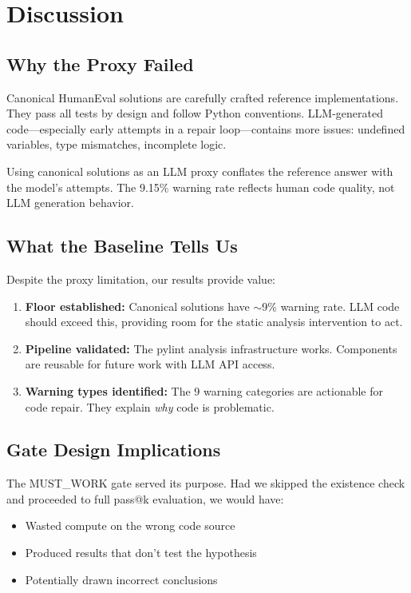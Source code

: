 \section{Discussion}

\subsection{Why the Proxy Failed}

Canonical HumanEval solutions are carefully crafted reference implementations. They pass all tests by design and follow Python conventions. LLM-generated code---especially early attempts in a repair loop---contains more issues: undefined variables, type mismatches, incomplete logic.

Using canonical solutions as an LLM proxy conflates the reference answer with the model's attempts. The 9.15\% warning rate reflects human code quality, not LLM generation behavior.

\subsection{What the Baseline Tells Us}

Despite the proxy limitation, our results provide value:

\begin{enumerate}
    \item \textbf{Floor established:} Canonical solutions have $\sim$9\% warning rate. LLM code should exceed this, providing room for the static analysis intervention to act.

    \item \textbf{Pipeline validated:} The pylint analysis infrastructure works. Components are reusable for future work with LLM API access.

    \item \textbf{Warning types identified:} The 9 warning categories are actionable for code repair. They explain \emph{why} code is problematic.
\end{enumerate}

\subsection{Gate Design Implications}

The MUST\_WORK gate served its purpose. Had we skipped the existence check and proceeded to full pass@k evaluation, we would have:
\begin{itemize}
    \item Wasted compute on the wrong code source
    \item Produced results that don't test the hypothesis
    \item Potentially drawn incorrect conclusions
\end{itemize}


